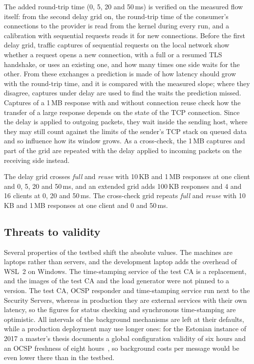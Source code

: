 \documentclass[conference,a4paper]{IEEEtran}
\begin{document}
The added round-trip time (0, 5, 20 and 50\,ms) is verified on the measured flow itself: from the
second delay grid on, the round-trip time of the consumer's connections to the provider is read from
the kernel during every run, and a calibration with sequential requests reads it for new connections.
Before the first delay grid, traffic captures of sequential requests on the local network show
whether a request opens a new connection, with a full or a resumed TLS handshake, or uses an existing
one, and how many times one side waits for the other. From these exchanges a prediction is made of how
latency should grow with the round-trip time, and it is compared with the measured slope; where they
disagree, captures under delay are used to find the waits the prediction missed. Captures of a 1\,MB
response with and without connection reuse check how the transfer of a large response depends on the
state of the TCP connection. Since the delay is applied to outgoing packets, they wait inside the
sending host, where they may still count against the limits of the sender's TCP stack on queued data
and so influence how its window grows. As a cross-check, the 1\,MB captures and part of the grid are
repeated with the delay applied to incoming packets on the receiving side instead.

The delay grid crosses \emph{full} and \emph{reuse} with 10\,KB and 1\,MB responses at one client
and 0, 5, 20 and 50\,ms, and an extended grid adds 100\,KB responses and 4 and 16 clients at 0, 20
and 50\,ms. The cross-check grid repeats \emph{full} and \emph{reuse} with 10\,KB and 1\,MB
responses at one client and 0 and 50\,ms.

\subsection{Threats to validity}

Several properties of the testbed shift the absolute values. The machines are laptops rather than
servers, and the development laptop adds the overhead of WSL~2 on Windows. The time-stamping service
of the test CA is a replacement, and the images of the test CA and the load generator were not pinned
to a version. The test CA, OCSP
responder and time-stamping service run next to the Security Servers, whereas in production they are
external services with their own latency, so the figures for status checking and synchronous
time-stamping are optimistic. All intervals of the background mechanisms are left at their defaults,
while a production deployment may use longer ones: for the Estonian instance of 2017 a master's
thesis documents a global configuration validity of six hours and an OCSP freshness of eight
hours~\cite{mironova2017}, so background costs per message would be even lower there than in the
testbed.
\end{document}
